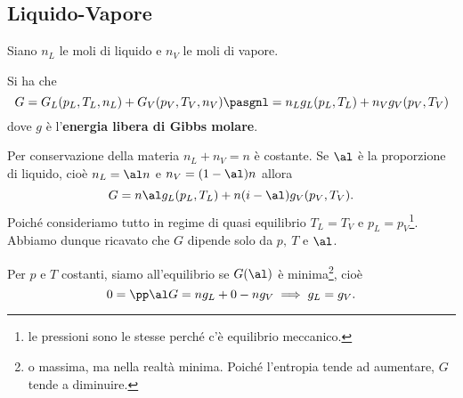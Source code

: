 \subsection{Liquido-Vapore}
Siano $n_L$ le moli di liquido e $n_V$ le moli di vapore.
\begin{remark}
Si ha che
\[G=G_L(p_L,T_L,n_L)+G_V(p_V,T_V,n_V)\pasgnl={}n_Lg_L(p_L,T_L)+n_Vg_V(p_V,T_V)\]
dove $g$ \`e l'\textbf{energia libera di Gibbs molare}.
\end{remark}
Per conservazione della materia $n_L+n_V=n$ \`e costante. Se $\al$ \`e la proporzione di liquido, cio\`e $n_L=\al n$ e $n_V=(1-\al)n$ allora
\[G=n\al g_L(p_L,T_L)+n(i-\al)g_V(p_V,T_V).\]
Poich\'e consideriamo tutto in regime di quasi equilibrio $T_L=T_V$ e $p_L=p_V$\footnote{le pressioni sono le stesse perch\'e c'\`e equilibrio meccanico.}. Abbiamo dunque ricavato che $G$ dipende solo da $p,\ T$ e $\al$.
\begin{remark}
Per $p$ e $T$ costanti, siamo all'equilibrio se $G(\al)$ \`e minima\footnote{o massima, ma nella realt\`a minima. Poich\'e l'entropia tende ad aumentare, $G$ tende a diminuire.}, cio\`e
\[0=\pp\al G=ng_L+0-n g_V\implies g_L=g_V.\]
\end{remark}
